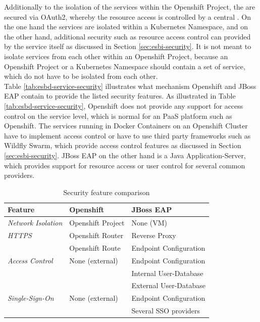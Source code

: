 Additionally to the isolation of the services within the Openshift Project, the  are secured via OAuth2, whereby the resource access is controlled by a central . On the one hand the services are isolated within a Kubernetes Namespace, and on the other hand, additional security such as resource access control can provided by the service itself as discussed in Section \vref{sec:esbi-security}. It is not meant to isolate services from each other within an Openshift Project, because an Openshift Project or a Kubernetes Namespace should contain a set of service, which do not have to be isolated from each other. \\

Table \vref{tab:esbd-service-security} illustrates what mechanism Openshift and JBoss EAP contain to provide the listed security features. As illustrated in Table \vref{tab:esbd-service-security}, Openshift does not provide any support for access control on the service level, which is normal for an PaaS platform such as Openshift. The services running in Docker Containers on an Openshift Cluster have to implement access control or have to use third party frameworks such as Wildfly Swarm, which provide access control features as discussed in Section \vref{sec:esbi-security}. JBoss EAP on the other hand is a Java Application-Server, which provides support for resource access or user control for several common providers. 

{\renewcommand{\arraystretch}{1.2}%
	\begin{table}[h]
		\begin{tabularx}{\textwidth}{ X|X|X }	
			\textbf{Feature}                 & \textbf{Openshift}      & \textbf{JBoss EAP} \\  \hline
			\textit{Network Isolation}       & Openshift Project       & None (VM) \\  \hline
			\textit{HTTPS}                   & Openshift Router        & Reverse Proxy \\
			                                 & Openshift Route         & Endpoint Configuration \\  \hline
            \textit{Access Control}          & None (external)         & Endpoint Configuration \\
                                                                      && Internal User-Database \\ 
                                                                      && External User-Database \\  \hline
            \textit{Single-Sign-On}          & None (external)         & Endpoint Configuration \\
                                                                      && Several SSO providers \\  \hline
		\end{tabularx}
		\caption{Security feature comparison}
		\label{tab:esbd-service-security}
\end{table}}


